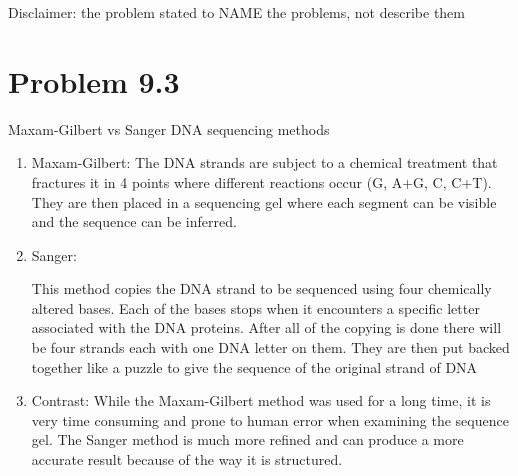 Disclaimer: the problem stated to NAME the problems, not describe them

\section{Problem 9.3}

Maxam-Gilbert vs Sanger DNA sequencing methods

\begin{enumerate}

\item Maxam-Gilbert: 
The DNA strands are subject to a chemical treatment that fractures it in 4 points where different reactions occur (G, A+G, C, C+T).  They are then placed in a sequencing gel where each segment can be visible and the sequence can be inferred. 
\item Sanger: 

This method copies the DNA strand to be sequenced using four chemically altered bases.  Each of the bases stops when it encounters a specific letter associated with the DNA proteins.  After all of the copying is done there will be four strands each with one DNA letter on them.  They are then put backed together like a puzzle to give the sequence of the original strand of DNA

\item Contrast: 
While the Maxam-Gilbert method was used for a long time, it is very time consuming and prone to human error when examining the sequence gel.  The Sanger method is much more refined and can produce a more accurate result because of the way it is structured.  
\end{enumerate}